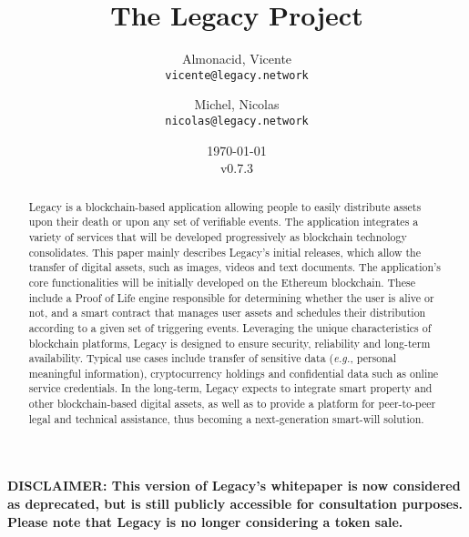\documentclass[12pt,french,english,notitlepage]{report} %
\title{The Legacy Project}
\author{  
	Almonacid, Vicente\\
	\texttt{vicente@legacy.network}
	\and
	Michel, Nicolas\\
	\texttt{nicolas@legacy.network}
}
\date{\today\\v0.7.3}
\begin{document}
{
	\noindent
	\large
	\textbf{DISCLAIMER: This version of Legacy's whitepaper is now considered as deprecated, but is still publicly accessible for consultation purposes. Please note that Legacy is no longer considering a token sale. \\}
	\vspace{0.3cm} \\
}

{\let\newpage\relax\maketitle}

\begin{abstract}	
    Legacy is a blockchain-based application allowing people to easily distribute assets upon their death or upon any set of verifiable events.
    The application integrates a variety of services that will be developed progressively as blockchain technology consolidates. 
    This paper mainly describes Legacy's initial releases, which allow the transfer of digital assets, such as images, videos and text documents. 
    The application's core functionalities will be initially developed on the Ethereum blockchain. These include a Proof of Life engine responsible for determining whether the user is alive or not, and a smart contract that manages user assets and schedules their distribution according to a given set of triggering events.
    Leveraging the unique characteristics of blockchain platforms, Legacy is designed to ensure security, reliability and long-term availability. 
    Typical use cases include transfer of sensitive data (\textit{e.g.}, personal meaningful information), cryptocurrency holdings and confidential data such as online service credentials.
    In the long-term, Legacy expects to integrate smart property and other blockchain-based digital assets, as well as to provide a platform for peer-to-peer legal and technical assistance, thus becoming a next-generation smart-will solution.

\end{abstract}
\end{document}
